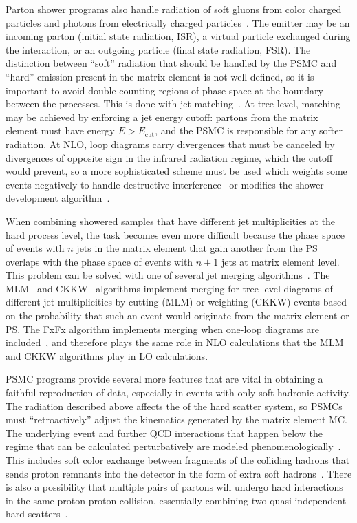 Parton shower programs also handle radiation of soft gluons from color charged particles and photons from electrically charged particles~\cite{Sjostrand:2004ef}.
The emitter may be an incoming parton (initial state radiation, ISR), a virtual particle exchanged during the interaction, or an outgoing particle (final state radiation, FSR).
The distinction between ``soft'' radiation that should be handled by the PSMC and ``hard'' emission present in the matrix element is not well defined, so it is important to avoid double-counting regions of phase space at the boundary between the processes.
This is done with jet matching~\cite{Alwall:2014hca,Olive:2016xmw}.
At tree level, matching may be achieved by enforcing a jet energy cutoff: partons from the matrix element must have energy $E > E_\text{cut}$, and the PSMC is responsible for any softer radiation.
At NLO, loop diagrams carry divergences that must be canceled by divergences of opposite sign in the infrared radiation regime, which the cutoff would prevent, so a more sophisticated scheme must be used which weights some events negatively to handle destructive interference~\cite{Alwall:2014hca} or modifies the shower development algorithm~\cite{Nason:2004rx,Frixione:2007vw}.

When combining showered samples that have different jet multiplicities at the hard process level, the task becomes even more difficult because the phase space of events with $n$ jets in the matrix element that gain another from the PS overlaps with the phase space of events with $n+1$ jets at matrix element level.
This problem can be solved with one of several jet merging algorithms~\cite{Alwall:2007fs,Alwall:2008qv,Alwall:2014hca,Rauch:2016pai}.
The MLM~\cite{Mangano:2006rw} and CKKW~\cite{Catani:2001cc} algorithms implement merging for tree-level diagrams of different jet multiplicities by cutting (MLM) or weighting (CKKW) events based on the probability that such an event would originate from the matrix element or PS\@.
The FxFx algorithm implements merging when one-loop diagrams are included~\cite{Frederix:2012ps}, and therefore plays the same role in NLO calculations that the MLM and CKKW algorithms play in LO calculations.

PSMC programs provide several more features that are vital in obtaining a faithful reproduction of data, especially in events with only soft hadronic activity.
The radiation described above affects the {\pt} of the hard scatter system, so PSMCs must ``retroactively'' adjust the kinematics generated by the matrix element MC\@.
The underlying event and further QCD interactions that happen below the regime that can be calculated perturbatively are modeled phenomenologically~\cite{Olive:2016xmw,Sjostrand:2014zea}.
This includes soft color exchange between fragments of the colliding hadrons that sends proton remnants into the detector in the form of extra soft hadrons~\cite{Sjostrand:2004pf}.
There is also a possibility that multiple pairs of partons will undergo hard interactions in the same proton-proton collision, essentially combining two quasi-independent hard scatters~\cite{Sjostrand:2004ef,Manohar:2012jr}.


